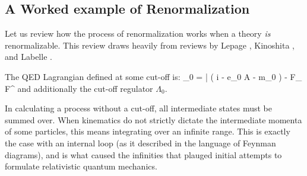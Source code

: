 


\subsection{A Worked example of Renormalization}
Let us review how the process of renormalization works when a theory \emph{is} renormalizable.  This review draws heavily from reviews by Lepage \cite{Lepage:1997cs,Lepage:1989hf}, Kinoshita \cite{Kinoshita:1990ai,Kinoshita:1998jfa}, and Labelle \cite{Labelle:1996en}.


The QED Lagrangian defined at some cut-off is:
\beq
	_0 = 
		\bar{\Psi} \left( i \partial \cdot \gamma - e_0 A \cdot \gamma - m_0 \right) \Psi -  F_{\mu\nu} F^{\mu\nu} 
\eeq 
and additionally the cut-off regulator $\Lambda_0$.  

In calculating a process without a cut-off, all intermediate states must be summed over.  When kinematics do not strictly dictate the intermediate momenta of some particles, this means integrating over an infinite range.  This is exactly the case with an internal loop (as it described in the language of Feynman diagrams), and is what caused the infinities that plauged initial attempts to formulate relativistic quantum mechanics. 

